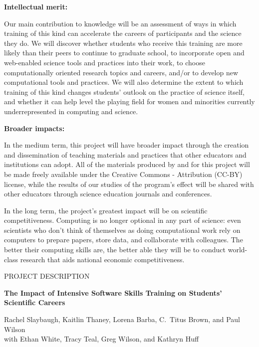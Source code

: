 \documentclass{proposalnsf}
\begin{document}
\textbf{Intellectual merit:}

Our main contribution to knowledge will be an assessment of ways in
which training of this kind can accelerate the careers of participants
and the science they do.  We will discover whether students who
receive this training are more likely than their peers to continue to
graduate school, to incorporate open and web-enabled science tools and
practices into their work, to choose computationally oriented research
topics and careers, and/or to develop new computational tools and
practices.  We will also determine the extent to which training of
this kind changes students' outlook on the practice of science itself,
and whether it can help level the playing field for women and
minorities currently underrepresented in computing and science.

\textbf {Broader impacts:}

In the medium term, this project will have broader impact through the
creation and dissemination of teaching materials and practices that
other educators and institutions can adopt.  All of the materials
produced by and for this project will be made freely available under
the Creative Commons - Attribution (CC-BY) license, while the results
of our studies of the program's effect will be shared with other
educators through science education journals and conferences.

In the long term, the project's greatest impact will be on scientific
competitiveness.  Computing is no longer optional in any part of
science: even scientists who don't think of themselves as doing
computational work rely on computers to prepare papers, store data,
and collaborate with colleagues.  The better their computing skills
are, the better able they will be to conduct world-class research that
aids national economic competitiveness.

\renewcommand{\thepage} {\footnotesize Project Summary}


\newpage

\pagestyle{plain}
\renewcommand{\thepage} {\arabic{page}}

\begin{center}
\small{PROJECT DESCRIPTION}


\large\textbf{The Impact of Intensive Software Skills Training on Students' Scientific Careers}

{\large \sf Rachel Slaybaugh, Kaitlin Thaney, Lorena Barba, C.\ Titus Brown, and Paul Wilson\\ 
  with Ethan White, Tracy Teal, Greg Wilson, and Kathryn Huff}

\end{center}
\end{document}
